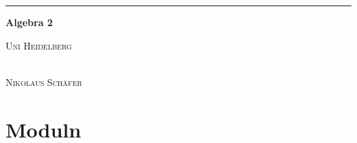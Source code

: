 \documentclass[10pt,a4paper,numbers=endperiod]{scrreprt}
\theoremstyle{definition}
\def\Namen{} %
\def\Datum{} %
\begin{document}
\Namen \hfill \Datum\par
\vspace{0.25\baselineskip}
\hrule
\vspace{\baselineskip}
\begin{center}
{\LARGE\textbf{Algebra 2}}\par
\vspace{0.25\baselineskip}
{\large\textsc{Uni Heidelberg}}
\end{center}

\vspace{\baselineskip}
\vspace{\baselineskip}
\vspace{\baselineskip}
\vspace{\baselineskip}
\vspace{\baselineskip}
\vspace{\baselineskip}
\vspace{\baselineskip}
\vspace{\baselineskip}
\vspace{\baselineskip}
\vspace{\baselineskip}
\vspace{\baselineskip}  
\vspace{\baselineskip}
\vspace{\baselineskip}
\vspace{\baselineskip}
\vspace{\baselineskip}
\vspace{\baselineskip}
\vspace{\baselineskip}
\vspace{\baselineskip}
\vspace{\baselineskip}
\vspace{\baselineskip}
\vspace{\baselineskip}

\begin{center}
	{\large{}}\\
	\vspace{0.3\baselineskip}
	{\large\textsc{Nikolaus Schäfer}}
\end{center}

\newpage
\vspace{0.125\baselineskip}
\tableofcontents %
\newpage

\part{Moduln} 
\end{document}

